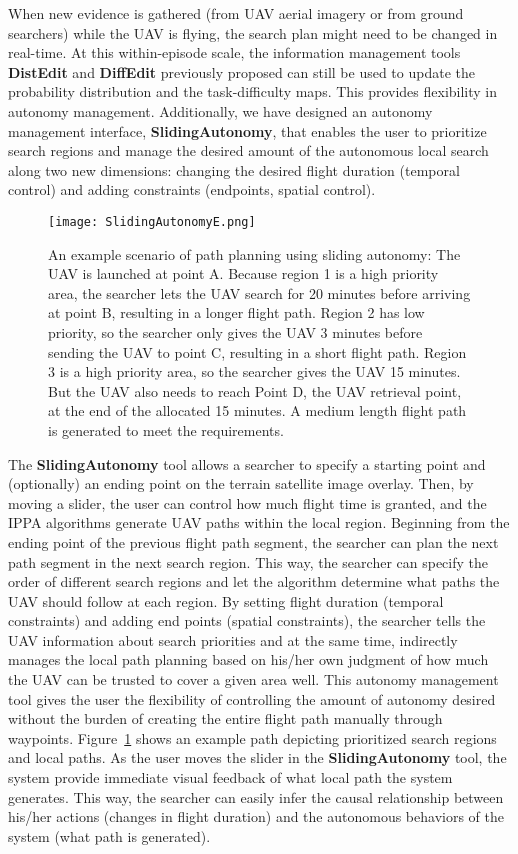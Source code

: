 When new evidence is gathered (from UAV aerial imagery or from ground searchers) while the UAV is flying, the search plan might need to be changed in real-time. At this within-episode scale, the information management tools \textbf{DistEdit} and \textbf{DiffEdit} previously proposed can still be used to update the probability distribution and the task-difficulty maps. This provides flexibility in autonomy management. Additionally, we have designed an autonomy management interface, \textbf{SlidingAutonomy}, that enables the user to prioritize search regions and manage the desired amount of the autonomous local search along two new dimensions: changing the desired flight duration (temporal control) and adding constraints (endpoints, spatial control).

\begin{figure}
\centering
\texttt{[image: SlidingAutonomyE.png]}
\caption[An example scenario of path planning using sliding autonomy]{An example scenario of path planning using sliding autonomy: The UAV is launched at point A. Because region 1 is a high priority area, the searcher lets the UAV search for 20 minutes before arriving at point B, resulting in a longer flight path. Region 2 has low priority, so the searcher only gives the UAV 3 minutes before sending the UAV to point C, resulting in a short flight path. Region 3 is a high priority area, so the searcher gives the UAV 15 minutes. But the UAV also needs to reach Point D, the UAV retrieval point, at the end of the allocated 15 minutes. A medium length flight path is generated to meet the requirements.}
\label{SlidingAutonomy}
\end{figure}

The \textbf{SlidingAutonomy} tool allows a searcher to specify a starting point and (optionally) an ending point on the terrain satellite image overlay. Then, by moving a slider, the user can control how much flight time is granted, and the IPPA algorithms generate UAV paths within the local region. Beginning from the ending point of the previous flight path segment, the searcher can plan the next path segment in the next search region. This way, the searcher can specify the order of different search regions and let the algorithm determine what paths the UAV should follow at each region. By setting flight duration (temporal constraints) and adding end points (spatial constraints), the searcher tells the UAV information about search priorities and at the same time, indirectly manages the local path planning based on his/her own judgment of how much the UAV can be trusted to cover a given area well. This autonomy management tool gives the user the flexibility of controlling the amount of autonomy desired without the burden of creating the entire flight path manually through waypoints. Figure~\ref{SlidingAutonomy} shows an example path depicting prioritized search regions and local paths. As the user moves the slider in the \textbf{SlidingAutonomy} tool, the system provide immediate visual feedback of what local path the system generates. This way, the searcher can easily infer the causal relationship between his/her actions (changes in flight duration) and the autonomous behaviors of the system (what path is generated). 

